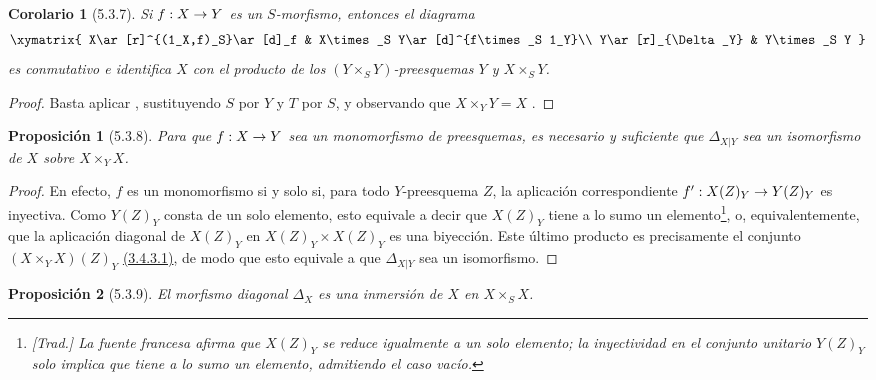 \documentclass[oneside]{amsart}
\theoremstyle{ega-env-style}
\theoremstyle{ega-thm-env-style}
\newtheorem*{proposition}{Proposición}
\newtheorem*{corollary}{Corolario}
\theoremstyle{ega-defn-env-style}
\renewcommand{\to}{\mathchoice{\longrightarrow}{\rightarrow}{\rightarrow}{\rightarrow}}
\let\EGAOriginalLabel\label
\renewcommand{\label}[1]{\phantomsection\EGAOriginalLabel{#1}}
\begin{document}
\begin{corollary}[5.3.7]
\label{I.5.3.7}
Si $f:X\to Y$ es un $S$-morfismo, entonces el diagrama
\[
  \xymatrix{
    X\ar[r]^{(1_X,f)_S}\ar[d]_f &
    X\times_S Y\ar[d]^{f\times_S 1_Y}\\
    Y\ar[r]_{\Delta_Y} &
    Y\times_S Y
  }
\]
es conmutativo e identifica $X$ con el producto de los $(Y\times_S Y)$-preesquemas $Y$ y $X\times_S Y$.
\end{corollary}

\begin{proof}
Basta aplicar , sustituyendo $S$ por $Y$ y $T$ por $S$, y observando que $X\times_Y Y=X$ .
\end{proof}

\begin{proposition}[5.3.8]
\label{I.5.3.8}
Para que $f:X\to Y$ sea un monomorfismo de preesquemas, es necesario y suficiente que $\Delta_{X|Y}$ sea un isomorfismo de $X$ sobre $X\times_Y X$.
\end{proposition}

\begin{proof}
En efecto, $f$ es un monomorfismo si y solo si, para todo $Y$-preesquema $Z$, la aplicación correspondiente $f':X(Z)_Y\to Y(Z)_Y$ es inyectiva.
Como $Y(Z)_Y$ consta de un solo elemento, esto equivale a decir que $X(Z)_Y$ tiene a lo sumo un elemento\footnote{\emph{[Trad.] La fuente francesa afirma que $X(Z)_Y$ se reduce igualmente a un solo elemento; la inyectividad en el conjunto unitario $Y(Z)_Y$ solo implica que tiene a lo sumo un elemento, admitiendo el caso vacío.}}, o, equivalentemente, que la aplicación diagonal de $X(Z)_Y$ en $X(Z)_Y\times X(Z)_Y$ es una biyección.
Este último producto es precisamente el conjunto $(X\times_Y X)(Z)_Y$ \hyperref[I.3.4.3.1-fr]{(3.4.3.1)}, de modo que esto equivale a que $\Delta_{X|Y}$ sea un isomorfismo.
\end{proof}

\begin{proposition}[5.3.9]
\label{I.5.3.9}
El morfismo diagonal $\Delta_X$ es una inmersión de $X$ en $X\times_S X$.
\end{proposition}
\end{document}
